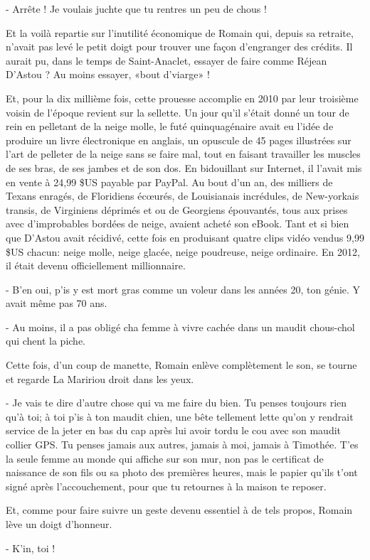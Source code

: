 - Arrête ! Je voulais juchte que tu rentres un peu de chous !

Et la voilà repartie sur l’inutilité économique de Romain qui, depuis sa retraite, n’avait pas levé le petit doigt pour trouver une façon d’engranger des crédits. Il aurait pu, dans le temps de Saint-Anaclet, essayer de faire comme Réjean D’Astou ? Au moins essayer, «bout d’viarge» !

Et, pour la dix millième fois, cette prouesse accomplie en 2010 par leur troisième voisin de l’époque revient sur la sellette. Un jour qu’il s’était donné un tour de rein en pelletant de la neige molle, le futé quinquagénaire avait eu l’idée de produire un livre électronique en anglais, un opuscule de 45 pages illustrées sur l’art de pelleter de la neige sans se faire mal, tout en faisant travailler les muscles de ses bras, de ses jambes et de son dos. En bidouillant sur Internet, il l’avait mis en vente à 24,99 \$US payable par PayPal. Au bout d’un an, des milliers de Texans enragés, de Floridiens écœurés, de Louisianais incrédules, de New-yorkais transis, de Virginiens déprimés et ou de Georgiens épouvantés, tous aux prises avec d’improbables bordées de neige, avaient acheté son eBook. Tant et si bien que D’Astou avait récidivé, cette fois en produisant quatre clips vidéo vendus 9,99 \$US chacun: neige molle, neige glacée, neige poudreuse, neige ordinaire. En 2012, il était devenu officiellement millionnaire.

- B’en oui, p’is y est mort gras comme un voleur dans les années 20, ton génie. Y avait même pas 70 ans.

- Au moins, il a pas obligé cha femme à vivre cachée dans un maudit chous-chol qui chent la piche.

Cette fois, d’un coup de manette, Romain enlève complètement le son, se tourne et regarde La Maririou droit dans les yeux.

- Je vais te dire d’autre chose qui va me faire du bien. Tu penses toujours rien qu’à toi; à toi p’is à ton maudit chien, une bête tellement lette qu’on y rendrait service de la jeter en bas du cap après lui avoir tordu le cou avec son maudit collier GPS. Tu penses jamais aux autres, jamais à moi, jamais à Timothée. T’es la seule femme au monde qui affiche sur son mur, non pas le certificat de naissance de son fils ou sa photo des premières heures, mais le papier qu’ils t’ont signé après l’accouchement, pour que tu retournes à la maison te reposer.

Et, comme pour faire suivre un geste devenu essentiel à de tels propos, Romain lève un doigt d’honneur.

- K’in, toi !